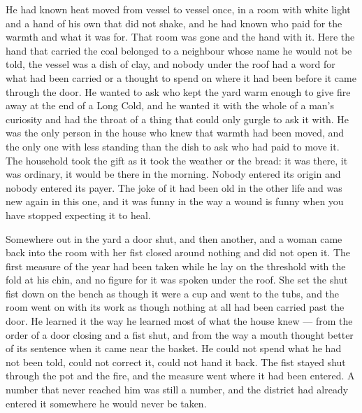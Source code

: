 He had known heat moved from vessel to vessel once, in a room with white light and a hand of his own that did not shake, and he had known who paid for the warmth and what it was for. That room was gone and the hand with it. Here the hand that carried the coal belonged to a neighbour whose name he would not be told, the vessel was a dish of clay, and nobody under the roof had a word for what had been carried or a thought to spend on where it had been before it came through the door. He wanted to ask who kept the yard warm enough to give fire away at the end of a Long Cold, and he wanted it with the whole of a man's curiosity and had the throat of a thing that could only gurgle to ask it with. He was the only person in the house who knew that warmth had been moved, and the only one with less standing than the dish to ask who had paid to move it. The household took the gift as it took the weather or the bread: it was there, it was ordinary, it would be there in the morning. Nobody entered its origin and nobody entered its payer. The joke of it had been old in the other life and was new again in this one, and it was funny in the way a wound is funny when you have stopped expecting it to heal.

Somewhere out in the yard a door shut, and then another, and a woman came back into the room with her fist closed around nothing and did not open it. The first measure of the year had been taken while he lay on the threshold with the fold at his chin, and no figure for it was spoken under the roof. She set the shut fist down on the bench as though it were a cup and went to the tubs, and the room went on with its work as though nothing at all had been carried past the door. He learned it the way he learned most of what the house knew --- from the order of a door closing and a fist shut, and from the way a mouth thought better of its sentence when it came near the basket. He could not spend what he had not been told, could not correct it, could not hand it back. The fist stayed shut through the pot and the fire, and the measure went where it had been entered. A number that never reached him was still a number, and the district had already entered it somewhere he would never be taken.

\scenebreak

